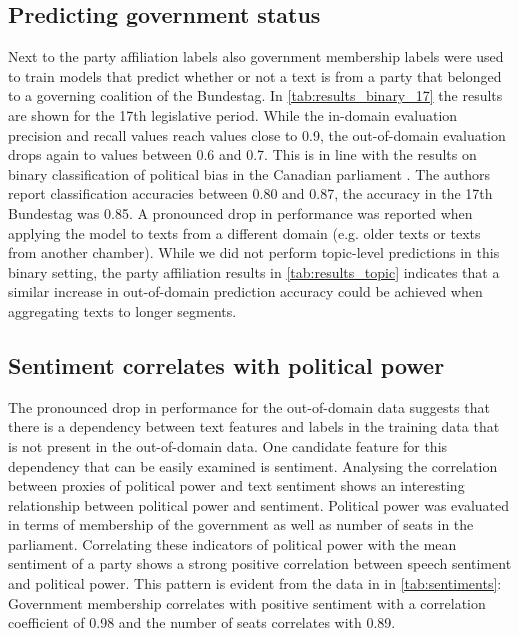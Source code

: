 \documentclass[11pt]{article}
\begin{document}
\subsection{Predicting government status}\label{sec:sentiment_result}
Next to the party affiliation labels also government membership labels were used to train models that predict whether or not a text is from a party that belonged to a governing coalition of the Bundestag. In \autoref{tab:results_binary_17} the results are shown for the 17th legislative period. While the in-domain evaluation precision and recall values reach values close to 0.9, the out-of-domain evaluation drops again to values between 0.6 and 0.7. This is in line with the results on binary classification of political bias in the Canadian parliament \cite{Yu2008}. The authors report classification accuracies between 0.80 and 0.87, the accuracy in the 17th Bundestag was 0.85. A pronounced drop in performance was reported when applying the model to texts from a different domain (e.g. older texts or texts from another chamber). While we did not perform topic-level predictions in this binary setting, the party affiliation results in \autoref{tab:results_topic} indicates that a similar increase in out-of-domain prediction accuracy could be achieved when aggregating texts to longer segments. \\


\subsection{Sentiment correlates with political power} 
The pronounced drop in performance for the out-of-domain data suggests that there is a dependency between text features and labels in the training data that is not present in the out-of-domain data. One candidate feature for this dependency that can be easily examined is sentiment. Analysing the correlation between proxies of political power and text sentiment shows an interesting relationship between political power and sentiment. Political power was evaluated in terms of membership of the government as well as number of seats in the parliament. Correlating these indicators of political power with the mean sentiment of a party shows a strong positive correlation between speech sentiment and political power. This pattern is evident from the data in 
in \autoref{tab:sentiments}: Government membership correlates with positive sentiment with a correlation coefficient of 0.98 and the number of seats correlates with 0.89.
\end{document}
